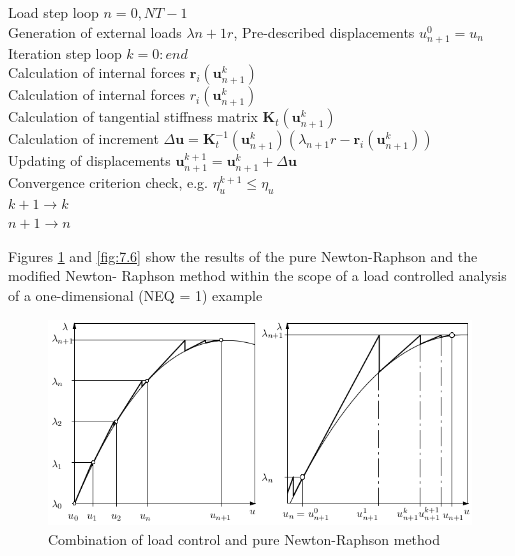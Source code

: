 \begin{framed}
Load step loop $n = 0, NT - 1$ \\
\hspace*{5mm} Generation of external loads $\lambda{ n+1} r$, Pre-described displacements $u^0_{ n+1} = u _n$\\
\hspace*{6mm}Iteration step loop $k = 0: end$ \\
\hspace*{12mm}Calculation of internal forces $ \boldsymbol{r}_{i}\left(\boldsymbol{u}_{n+1}^{k}\right) $ \\
\hspace*{12mm}Calculation of internal forces $ r_{i}\left(\boldsymbol{u}_{n+1}^{k}\right) $ \\ 
\hspace*{12mm}Calculation of tangential stiffness matrix $ \mathbf{K}_{t}\left(\boldsymbol{u}_{n+1}^{k}\right) $\\
\hspace*{12mm}Calculation of increment $ \Delta \boldsymbol{u}=\mathbf{K}_{t}^{-1}\left(\boldsymbol{u}_{n+1}^{k}\right)\left(\lambda_{n+1} r-\boldsymbol{r}_{i}\left(\boldsymbol{u}_{n+1}^{k}\right)\right) $\\
\hspace*{12mm}Updating of displacements $ \boldsymbol{u}_{n+1}^{k+1}=\boldsymbol{u}_{n+1}^{k}+\Delta \boldsymbol{u} $\\
\hspace*{12mm}Convergence criterion check, e.g. $ \eta_{u}^{k+1} \leq \eta_{u} $\\
 \hspace*{6mm}$ k+1 \longrightarrow k $\\
$ n+1 \longrightarrow n $
\end{framed}

Figures \ref{fig:7.5} and \ref{fig:7.6} show the results of the pure Newton-Raphson and the modified Newton-
Raphson method within the scope of a load controlled analysis of a one-dimensional (NEQ = 1)
example

\begin{figure}[H]
    \centering
    \includegraphics[scale=0.6]{Figure2/Chap3/load control and pure Newton-Raphson.png}
    \caption{Combination of load control and pure Newton-Raphson method}
    \label{fig:7.5}
\end{figure}

